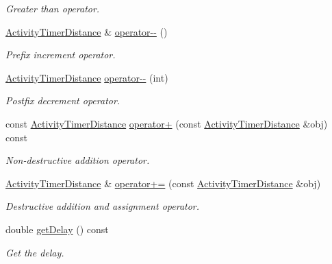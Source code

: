 \begin{DoxyCompactItemize}
\begin{DoxyCompactList}\small\item\em \-Greater than operator. \end{DoxyCompactList}\item 
\hyperlink{classcryomesh_1_1components_1_1ActivityTimerDistance}{\-Activity\-Timer\-Distance} \& \hyperlink{classcryomesh_1_1components_1_1ActivityTimerDistance_adf508add943655664c792c93795406fd}{operator-\/-\/} ()
\begin{DoxyCompactList}\small\item\em \-Prefix increment operator. \end{DoxyCompactList}\item 
\hyperlink{classcryomesh_1_1components_1_1ActivityTimerDistance}{\-Activity\-Timer\-Distance} \hyperlink{classcryomesh_1_1components_1_1ActivityTimerDistance_aa8f2cf4dbabcc623aa7e0cf1f793f98a}{operator-\/-\/} (int)
\begin{DoxyCompactList}\small\item\em \-Postfix decrement operator. \end{DoxyCompactList}\item 
const \hyperlink{classcryomesh_1_1components_1_1ActivityTimerDistance}{\-Activity\-Timer\-Distance} \hyperlink{classcryomesh_1_1components_1_1ActivityTimerDistance_a7c91c5d5255899d6504cc3fe6669cbab}{operator+} (const \hyperlink{classcryomesh_1_1components_1_1ActivityTimerDistance}{\-Activity\-Timer\-Distance} \&obj) const 
\begin{DoxyCompactList}\small\item\em \-Non-\/destructive addition operator. \end{DoxyCompactList}\item 
\hyperlink{classcryomesh_1_1components_1_1ActivityTimerDistance}{\-Activity\-Timer\-Distance} \& \hyperlink{classcryomesh_1_1components_1_1ActivityTimerDistance_aaf72572d1cb481f519132e7a17b8125b}{operator+=} (const \hyperlink{classcryomesh_1_1components_1_1ActivityTimerDistance}{\-Activity\-Timer\-Distance} \&obj)
\begin{DoxyCompactList}\small\item\em \-Destructive addition and assignment operator. \end{DoxyCompactList}\item 
double \hyperlink{classcryomesh_1_1components_1_1ActivityTimerDistance_aa0ded366836ca5bb7ce9db6abf7b4d51}{get\-Delay} () const 
\begin{DoxyCompactList}\small\item\em \-Get the delay. \end{DoxyCompactList}\item 

\end{DoxyCompactItemize}
